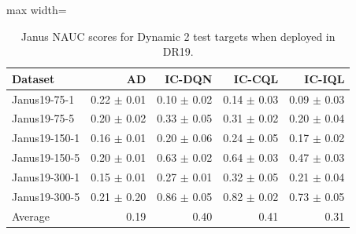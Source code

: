 \documentclass{article}
\begin{document}
\begin{table}[ht]
    \label{tab:}
    \begin{center}
    \caption{Janus NAUC scores for Dynamic 2 test targets when deployed in DR19.}
    \begin{small}
    \begin{adjustbox}{max width=\columnwidth}
		\begin{tabular}{l|rrrr}
		\toprule
	\textbf{Dataset} & \textbf{AD} & \textbf{IC-DQN} & \textbf{IC-CQL} & \textbf{IC-IQL}\\
\midrule
Janus19-75-1 & 0.22 $\pm$ 0.01 & 0.10 $\pm$ 0.02 & 0.14 $\pm$ 0.03 & 0.09 $\pm$ 0.03\\
Janus19-75-5 & 0.20 $\pm$ 0.02 & 0.33 $\pm$ 0.05 & 0.31 $\pm$ 0.02 & 0.20 $\pm$ 0.04\\
Janus19-150-1 & 0.16 $\pm$ 0.01 & 0.20 $\pm$ 0.06 & 0.24 $\pm$ 0.05 & 0.17 $\pm$ 0.02\\
Janus19-150-5 & 0.20 $\pm$ 0.01 & 0.63 $\pm$ 0.02 & 0.64 $\pm$ 0.03 & 0.47 $\pm$ 0.03\\
Janus19-300-1 & 0.15 $\pm$ 0.01 & 0.27 $\pm$ 0.01 & 0.32 $\pm$ 0.05 & 0.21 $\pm$ 0.04\\
Janus19-300-5 & 0.21 $\pm$ 0.20 & 0.86 $\pm$ 0.05 & 0.82 $\pm$ 0.02 & 0.73 $\pm$ 0.05\\
\midrule
Average & 0.19 & 0.40 & 0.41 & 0.31\\
\end{tabular}
        \end{adjustbox}
    \end{small}
    \end{center}
    \vskip -0.1in
\end{table}
\end{document}
